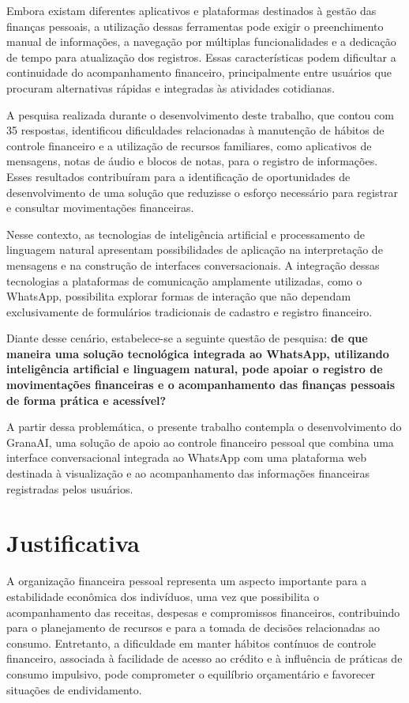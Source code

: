 Embora existam diferentes aplicativos e plataformas destinados à gestão das finanças pessoais, a utilização dessas ferramentas pode exigir o preenchimento manual de informações, a navegação por múltiplas funcionalidades e a dedicação de tempo para atualização dos registros. Essas características podem dificultar a continuidade do acompanhamento financeiro, principalmente entre usuários que procuram alternativas rápidas e integradas às atividades cotidianas.

A pesquisa realizada durante o desenvolvimento deste trabalho, que contou com 35 respostas, identificou dificuldades relacionadas à manutenção de hábitos de controle financeiro e a utilização de recursos familiares, como aplicativos de mensagens, notas de áudio e blocos de notas, para o registro de informações. Esses resultados contribuíram para a identificação de oportunidades de desenvolvimento de uma solução que reduzisse o esforço necessário para registrar e consultar movimentações financeiras.

Nesse contexto, as tecnologias de inteligência artificial e processamento de linguagem natural apresentam possibilidades de aplicação na interpretação de mensagens e na construção de interfaces conversacionais. A integração dessas tecnologias a plataformas de comunicação amplamente utilizadas, como o WhatsApp, possibilita explorar formas de interação que não dependam exclusivamente de formulários tradicionais de cadastro e registro financeiro.

Diante desse cenário, estabelece-se a seguinte questão de pesquisa: \textbf{de que maneira uma solução tecnológica integrada ao WhatsApp, utilizando inteligência artificial e linguagem natural, pode apoiar o registro de movimentações financeiras e o acompanhamento das finanças pessoais de forma prática e acessível?}

A partir dessa problemática, o presente trabalho contempla o desenvolvimento do GranaAI, uma solução de apoio ao controle financeiro pessoal que combina uma interface conversacional integrada ao WhatsApp com uma plataforma web destinada à visualização e ao acompanhamento das informações financeiras registradas pelos usuários.

\section{Justificativa}

A organização financeira pessoal representa um aspecto importante para a estabilidade econômica dos indivíduos, uma vez que possibilita o acompanhamento das receitas, despesas e compromissos financeiros, contribuindo para o planejamento de recursos e para a tomada de decisões relacionadas ao consumo. Entretanto, a dificuldade em manter hábitos contínuos de controle financeiro, associada à facilidade de acesso ao crédito e à influência de práticas de consumo impulsivo, pode comprometer o equilíbrio orçamentário e favorecer situações de endividamento.


